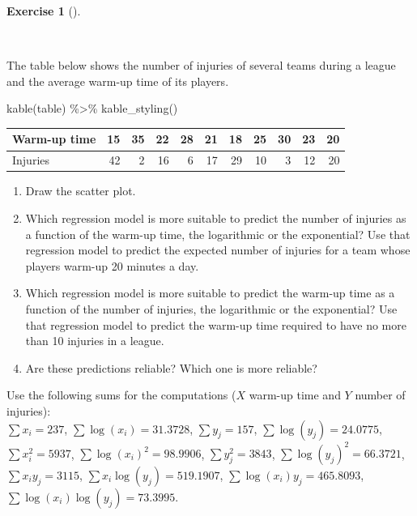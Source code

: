 \documentclass[
  a4paper,
]{scrreport}
\newenvironment{Shaded}{\begin{snugshade}}{\end{snugshade}}
\newcommand{\FunctionTok}[1]{\textcolor[rgb]{0.28,0.35,0.67}{#1}}
\newcommand{\NormalTok}[1]{\textcolor[rgb]{0.00,0.23,0.31}{#1}}
\newcommand{\SpecialCharTok}[1]{\textcolor[rgb]{0.37,0.37,0.37}{#1}}
\theoremstyle{definition}
\newtheorem{exercise}{Exercise}[chapter]
\theoremstyle{remark}
\begin{document}
\begin{exercise}[]\protect\hypertarget{exr-2}{}\label{exr-2}

~

The table below shows the number of injuries of several teams during a
league and the average warm-up time of its players.

\begin{Shaded}
\begin{Highlighting}[]
\FunctionTok{kable}\NormalTok{(table) }\SpecialCharTok{\%\textgreater{}\%} \FunctionTok{kable\_styling}\NormalTok{()}
\end{Highlighting}
\end{Shaded}

\begin{table}
\centering
\begin{tabular}{l|r|r|r|r|r|r|r|r|r|r}
\hline
Warm-up time & 15 & 35 & 22 & 28 & 21 & 18 & 25 & 30 & 23 & 20\\
\hline
Injuries & 42 & 2 & 16 & 6 & 17 & 29 & 10 & 3 & 12 & 20\\
\hline
\end{tabular}
\end{table}

\begin{enumerate}
\def\labelenumi{\alph{enumi}.}
\item
  Draw the scatter plot.
\item
  Which regression model is more suitable to predict the number of
  injuries as a function of the warm-up time, the logarithmic or the
  exponential? Use that regression model to predict the expected number
  of injuries for a team whose players warm-up 20 minutes a day.
\item
  Which regression model is more suitable to predict the warm-up time as
  a function of the number of injuries, the logarithmic or the
  exponential? Use that regression model to predict the warm-up time
  required to have no more than 10 injuries in a league.
\item
  Are these predictions reliable? Which one is more reliable?
\end{enumerate}

Use the following sums for the computations (\(X\) warm-up time and
\(Y\) number of injuries):\\
\(\sum x_i=237\), \(\sum \log(x_i)=31.3728\), \(\sum y_j=157\),
\(\sum \log(y_j)=24.0775\),\\
\(\sum x_i^2=5937\), \(\sum \log(x_i)^2=98.9906\), \(\sum y_j^2=3843\),
\(\sum \log(y_j)^2=66.3721\),\\
\(\sum x_iy_j=3115\), \(\sum x_i\log(y_j)=519.1907\),
\(\sum \log(x_i)y_j=465.8093\), \(\sum \log(x_i)\log(y_j)=73.3995\).

\end{exercise}
\end{document}
